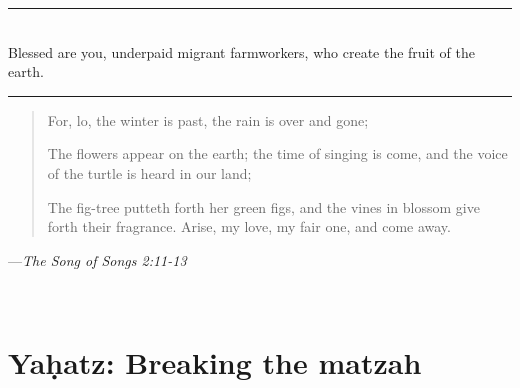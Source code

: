 \documentclass[letter,11pt,openany]{memoir}
\newcommand{\HgSource}[1]{\hfill{\small---\itshape{#1}}}
\newcommand{\HgFill}{
\vfill \hrule 
\vfill}
\newenvironment{HgEnglish}{\strut\\
\noindent}{\vspace{1em}}
\newcommand{\JSrc}{\textsuperscript{\upshape{[J]}}}
\newcommand{\SSrc}{\textsuperscript{\upshape{[S]}}}
\begin{document}
\HgFill
\begin{HgEnglish}
	Blessed are you, underpaid migrant farmworkers, who create the fruit of the earth.\SSrc 
\end{HgEnglish}

\HgFill
\begin{verse}
	For, lo, the winter is past, the rain is over and gone;
	
	The flowers appear on the earth; the time of singing is come, and the voice of the turtle is heard in our land;
	
	The fig-tree putteth forth her green figs, and the vines in blossom give forth their fragrance. Arise, my love, my fair one, and come away. 
\end{verse}
\HgSource{The Song of Songs 2:11-13 \JSrc}
\begin{HgEnglish}
\end{HgEnglish}

\chapter*{Ya\d{h}atz: Breaking the matzah}

\vfill
\end{document}
